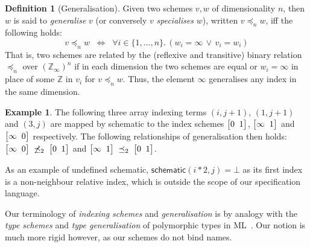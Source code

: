 \documentclass[9pt,preprint]{sigplanconf}
\newcounter{block}
\theoremstyle{definition}
\newtheorem{example}[block]{Example}
\newtheorem{definition}[block]{Definition}
\newcommand{\vtwoh}[2]{\setlength{\arraycolsep}{0em}
\left[\begin{array}{cc}#1 \; & \; #2\end{array}\right]}
\begin{document}
\begin{definition}[Generalisation]
Given two schemes $v, w$ of dimensionality $n$,
then $w$ is said to \emph{generalise} $v$
(or conversely $v$ \emph{specialises} $w$),
written $v \preceq_n w$, iff the following holds:
\[
v \preceq_n w \;\; \Leftrightarrow  \;\;
  \forall i\!\in\!\{ 1, \ldots, n \} . \, (w_i = \infty \, \vee \, v_i = w_i)
\]
That is, two schemes are related by the (reflexive and transitive) binary relation
$\preceq_n$ over $(\mathbb{Z}_{\infty})^n$ if in each dimension
the two schemes are equal or $w_i = \infty$
in place of some $\mathbb{Z}$ in $v_i$ for $v \preceq_n w$.
Thus, the element $\infty$ generalises any index in the same dimension.
%
\end{definition}



\begin{example}
The following three array indexing terms
$(i, j+1)$, $(1, j+1)$ and $(3, j)$ 
are mapped by \textsf{schematic} to the 
index schemes $\vtwoh{0}{1}$, $\vtwoh{\infty}{1}$
and $\vtwoh{\infty}{0}$ respectively. The following
relationships of generalisation then holds:
$\vtwoh{\infty}{0} \; \not\preceq_2 \; \vtwoh{0}{1}$
and
$\vtwoh{\infty}{1} \; \preceq_2 \; \vtwoh{0}{1}$. 

As an example of undefined \textsf{schematic}, 
 $\textsf{schematic}(i*2, j) = \bot$ as its first index is a non-neighbour relative index, which
 is outside the scope of our specification language.
\end{example}
\noindent
Our terminology of \emph{indexing schemes} and
\emph{generalisation} is by analogy
with the \emph{type schemes} and \emph{type generalisation} of
polymorphic types in ML~\cite{milner1978theory}. Our notion is
much more rigid however, as our schemes do not bind names.
\end{document}
